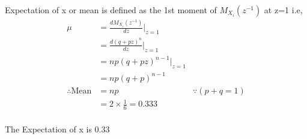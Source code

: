 \documentclass[a4paper,10pt,two column]{article}
\begin{document}
Expectation of x or mean is defined as the 1st moment of $M_{X_i}(z^{-1})$ at z=1 i.e,
\begin{align}
\mu&= \frac{dM_{X_i}(z^{-1})}{dz}|_{z=1}&
\\
&= \frac{d(q + pz)^n}{dz}|_{z=1}&
\\
&=np(q + pz)^{n-1}|_{z=1}&
\\
&= np(q + p)^{n-1}&
\\
\therefore \text{Mean} &= np& {}\because(p+q=1)
\\
&= 2\times\frac{1}{6}= 0.333&
\end{align}
\\

The Expectation of x  is $0.33$
\\
\end{document}
